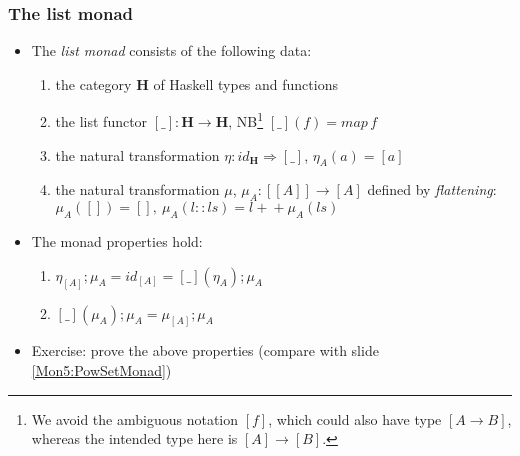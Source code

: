 \documentclass[handout]{beamer}
\newcommand{\To}{\Rightarrow}
\newcommand{\bfsf}[1]{{\boldsymbol{#1}}}
\newcommand{\HH}{\bfsf{H}}
\begin{document}
\frame
  {   
    \frametitle{The list monad}\label{Mon5:ListMonad}

 \begin{itemize}[<+->]
\item The \emph{list monad} consists of the following data:
 \begin{enumerate}
    \item the category $\HH$ of Haskell types and functions
    \item the list functor $[\_]:\HH\to\HH$, NB\footnote%
{We avoid the ambiguous notation $[f]$, which could also have type $[A\to B]$,
whereas the intended type here is $[A]\to [B]$.}
 $[\_](f)  =  map\, f$
    \item the natural transformation $\eta: id_\HH \To [\_]$, $\eta_A(a)= [a]$
    \item the natural transformation $\mu$, 
$\mu_A: [[A]] \to [A] $ defined by \emph{flattening}:
$\mu_A([]) = [],~\mu_A(l::ls) = l{+}\!{+}\mu_A(ls)$
 \end{enumerate}
\item The monad properties hold:
 \begin{enumerate}
    \item $\eta_{[A]};\mu_A = id_{[A]} = [\_](\eta_A);\mu_A$
    \item $[\_](\mu_A);\mu_A = \mu_{[A]};\mu_A$
 \end{enumerate}
\item Exercise: prove the above properties (compare with slide \ref{Mon5:PowSetMonad})
 \end{itemize}

 }
\end{document}
